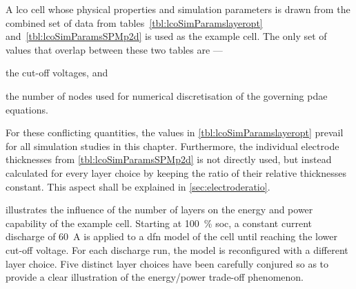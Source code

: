 A  \gls{lco}  cell  whose  physical  properties  and  simulation  parameters  is
drawn from  the combined set of  data from tables~\ref{tbl:lcoSimParamslayeropt}
and~\ref{tbl:lcoSimParamsSPMp2d} is  used as the  example cell. The only  set of
values that overlap between these two tables are ---
\begin{enumerate*}[label=\itshape\alph*\upshape)]
    \item the cut-off voltages, and
    \item the number of nodes  used for numerical  discretisation of  the governing  \gls{pdae} equations.
\end{enumerate*}
For these conflicting quantities,  the values in \cref{tbl:lcoSimParamslayeropt}
prevail for all simulation studies  in this chapter. Furthermore, the individual
electrode thicknesses  from \cref{tbl:lcoSimParamsSPMp2d} is not  directly used,
but  instead  calculated  for  every  layer  choice  by  keeping  the  ratio  of
their  relative  thicknesses  constant.  This   aspect  shall  be  explained  in
\cref{sec:electroderatio}.

  illustrates  the  influence  of  the  number
of  layers   on  the  energy   and  power   capability  of  the   example  cell.
Starting  at  \SI{100}{\percent}  \gls{soc},  a constant  current  discharge  of
\SI{60}{\ampere}\footnotemark{}  is applied  to a  \gls{dfn} model  of the  cell
until reaching the  lower cut-off voltage. For each discharge  run, the model is
reconfigured  with  a  different  layer  choice.  Five  distinct  layer  choices
have  been carefully  conjured so  as  to provide  a clear  illustration of  the
energy/power trade-off phenomenon.

